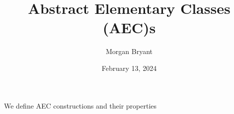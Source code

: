 \documentclass[a4paper]{article}
\title{Abstract Elementary Classes (AEC)s}
\date{February 13, 2024}
\author{Morgan Bryant}
\begin{document}
\maketitle
\par{We define AEC constructions and their properties}
\printbibliography
\end{document}
